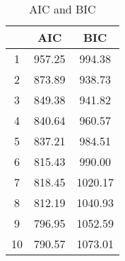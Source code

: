 \begin{table}[ht]
\centering
\caption{AIC and BIC} 
\label{tab:ABIC}
\begin{tabular}{|c|cc|}
  \hline
 & AIC & BIC \\ 
  \hline
1 & 957.25 & 994.38 \\ 
  2 & 873.89 & 938.73 \\ 
  3 & 849.38 & 941.82 \\ 
  4 & 840.64 & 960.57 \\ 
  5 & 837.21 & 984.51 \\ 
  6 & 815.43 & 990.00 \\ 
  7 & 818.45 & 1020.17 \\ 
  8 & 812.19 & 1040.93 \\ 
  9 & 796.95 & 1052.59 \\ 
  10 & 790.57 & 1073.01 \\ 
   \hline
\end{tabular}
\end{table}
